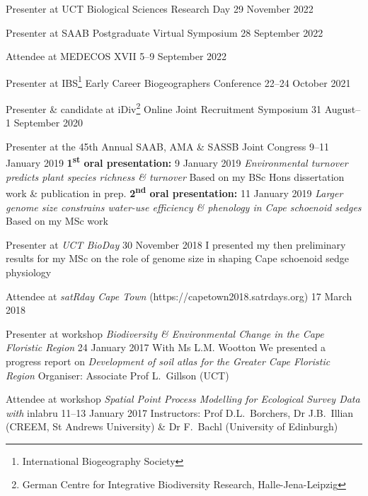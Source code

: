 \documentclass[10pt]{article}
\begin{document}
\begin{hangparas}{2em}{1}

Presenter at UCT Biological Sciences Research Day        \hfill 29 November 2022

Presenter at SAAB Postgraduate Virtual Symposium        \hfill 28 September 2022

Attendee at MEDECOS XVII                              \hfill 5--9 September 2022

Presenter at IBS\footnote{International Biogeography Society}
Early Career Biogeographers Conference                \hfill 22--24 October 2021

Presenter \& candidate at iDiv\footnote{German Centre for Integrative
Biodiversity Research, Halle-Jena-Leipzig} Online Joint Recruitment Symposium
                              \hfill 31 August--1 September 2020

Presenter at the 45th Annual SAAB, AMA \& SASSB Joint Congress
                                       \hfill 9--11 January 2019 \break
\textbf{1\textsuperscript{st} oral presentation:}
                                           \hfill 9 January 2019 \break
\textit{Environmental turnover predicts plant species richness \& turnover}
\break
Based on my BSc Hons dissertation work \& publication in prep. \break
\textbf{2\textsuperscript{nd} oral presentation:}
                                          \hfill 11 January 2019 \break
\textit{Larger genome size constrains water-use efficiency \& phenology in 
Cape schoenoid sedges} \break
Based on my MSc work

Presenter at \textit{UCT BioDay}         \hfill 30 November 2018 \break
I presented my then preliminary results for my MSc on the role of genome size in 
shaping Cape schoenoid sedge physiology

Attendee at \textit{satRday Cape Town} (https://capetown2018.satrdays.org)
                                                   \hfill 17 March 2018

Presenter at workshop \textit{Biodiversity \& Environmental Change in the Cape 
Floristic Region}                         \hfill 24 January 2017 \break
With Ms L.M. Wootton \break
We presented a progress report on \textit{Development of soil atlas for the 
Greater Cape Floristic Region} \break
Organiser: Associate Prof L.~Gillson (UCT)

Attendee at workshop \textit{Spatial Point Process Modelling for Ecological 
Survey Data with} inlabru             \hfill 11--13 January 2017 \break
Instructors: Prof D.L.~Borchers, Dr J.B.~Illian (CREEM, St Andrews University) 
\& Dr F.~Bachl (University of Edinburgh)

\hfill

\end{hangparas}
\end{document}
